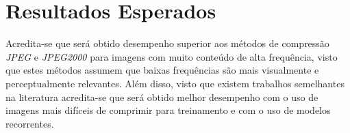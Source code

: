 \section{Resultados Esperados}
\label{sec:expectativa}
Acredita-se que será obtido desempenho superior aos métodos de compressão \textit{JPEG} e \textit{JPEG2000} para imagens com muito conteúdo de alta frequência, visto que estes métodos assumem que baixas frequências são mais visualmente e perceptualmente relevantes. Além disso, visto que existem trabalhos semelhantes na literatura acredita-se que será obtido melhor desempenho com o uso de imagens mais difíceis de comprimir para treinamento e com o uso de modelos recorrentes. 

